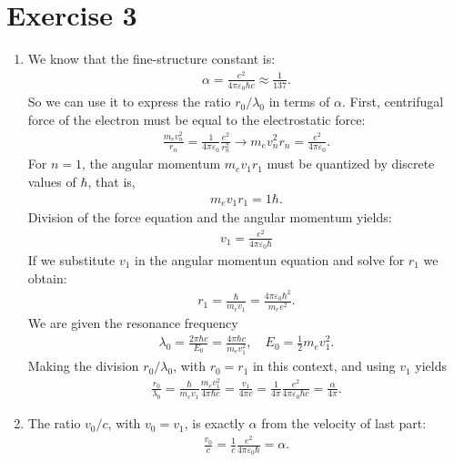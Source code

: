 \documentclass[letterpaper,11pt,twoside]{article}
\begin{document}
\section*{Exercise 3}
\begin{enumerate}[itemsep=0pt,topsep=0pt,parsep=0pt,label=\alph*)]
  \item We know that the fine-structure constant is:
  \begin{align*}
    \alpha=\frac{e^2}{4\pi\varepsilon_0\hbar c}\approx\frac{1}{137}.
  \end{align*}
  So we can use it to express the ratio $r_0/\lambda_0$ in terms of $\alpha$.
  First, centrifugal force of the electron must be equal to the electrostatic force:
  \begin{align*}
    \frac{m_ev_n^2}{r_n}=\frac{1}{4\pi\varepsilon_0}\frac{e^2}{r_n^2}\longrightarrow m_ev_n^2r_n=\frac{e^2}{4\pi\varepsilon_0}.
  \end{align*}
  For $n=1$, the angular momentum $m_ev_1r_1$ must be quantized by discrete values of $\hbar$, that is,
  \begin{align*}
    m_ev_1r_1=1\hbar.
  \end{align*}
  Division of the force equation and the angular momentum yields:
  \begin{align*}
    v_1=\frac{e^2}{4\pi\varepsilon_0\hbar}
  \end{align*}
  If we substitute $v_1$ in the angular momentun equation and solve for $r_1$ we obtain:
  \begin{align*}
    r_1=\frac{\hbar}{m_ev_1}=\frac{4\pi\varepsilon_0\hbar^2}{m_ee^2}.
  \end{align*}
  We are given the resonance frequency 
  \begin{align*}
    \lambda_0=\frac{2\pi\hbar c}{E_0}=\frac{4\pi\hbar c}{m_ev_1^2},\quad E_0=\frac{1}{2}m_ev_1^2.
  \end{align*}
  Making the division $r_0/\lambda_0$, with $r_0=r_1$ in this context, and using $v_1$ yields
  \begin{align*}
    \frac{r_0}{\lambda_0}=\frac{\hbar}{m_ev_1}\frac{m_ev_1^2}{4\pi\hbar c}=\frac{v_1}{4\pi c}=\frac{1}{4\pi}\frac{e^2}{4\pi\varepsilon_0\hbar c}=\frac{\alpha}{4\pi}.
  \end{align*}
  \item The ratio $v_0/c$, with $v_0=v_1$, is exactly $\alpha$ from the velocity of last part:
  \begin{align*}
    \frac{v_0}{c}=\frac{1}{c}\frac{e^2}{4\pi\varepsilon_0\hbar}=\alpha.
  \end{align*}

\end{enumerate}
\end{document}
